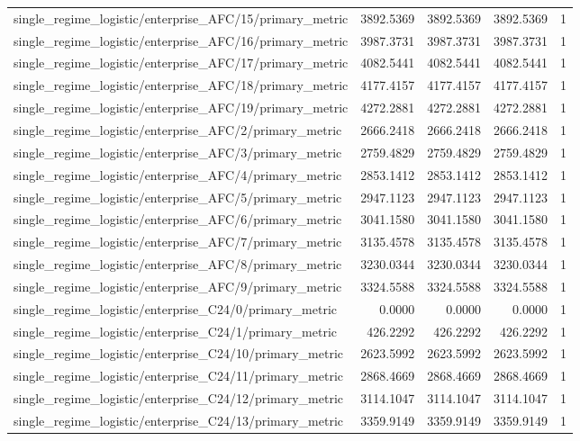 \begin{table}[h]
\begin{tabular}{lrrrr}
single_regime_logistic/enterprise_AFC/15/primary_metric & 3892.5369 & 3892.5369 & 3892.5369 & 1 \\
single_regime_logistic/enterprise_AFC/16/primary_metric & 3987.3731 & 3987.3731 & 3987.3731 & 1 \\
single_regime_logistic/enterprise_AFC/17/primary_metric & 4082.5441 & 4082.5441 & 4082.5441 & 1 \\
single_regime_logistic/enterprise_AFC/18/primary_metric & 4177.4157 & 4177.4157 & 4177.4157 & 1 \\
single_regime_logistic/enterprise_AFC/19/primary_metric & 4272.2881 & 4272.2881 & 4272.2881 & 1 \\
single_regime_logistic/enterprise_AFC/2/primary_metric & 2666.2418 & 2666.2418 & 2666.2418 & 1 \\
single_regime_logistic/enterprise_AFC/3/primary_metric & 2759.4829 & 2759.4829 & 2759.4829 & 1 \\
single_regime_logistic/enterprise_AFC/4/primary_metric & 2853.1412 & 2853.1412 & 2853.1412 & 1 \\
single_regime_logistic/enterprise_AFC/5/primary_metric & 2947.1123 & 2947.1123 & 2947.1123 & 1 \\
single_regime_logistic/enterprise_AFC/6/primary_metric & 3041.1580 & 3041.1580 & 3041.1580 & 1 \\
single_regime_logistic/enterprise_AFC/7/primary_metric & 3135.4578 & 3135.4578 & 3135.4578 & 1 \\
single_regime_logistic/enterprise_AFC/8/primary_metric & 3230.0344 & 3230.0344 & 3230.0344 & 1 \\
single_regime_logistic/enterprise_AFC/9/primary_metric & 3324.5588 & 3324.5588 & 3324.5588 & 1 \\
single_regime_logistic/enterprise_C24/0/primary_metric & 0.0000 & 0.0000 & 0.0000 & 1 \\
single_regime_logistic/enterprise_C24/1/primary_metric & 426.2292 & 426.2292 & 426.2292 & 1 \\
single_regime_logistic/enterprise_C24/10/primary_metric & 2623.5992 & 2623.5992 & 2623.5992 & 1 \\
single_regime_logistic/enterprise_C24/11/primary_metric & 2868.4669 & 2868.4669 & 2868.4669 & 1 \\
single_regime_logistic/enterprise_C24/12/primary_metric & 3114.1047 & 3114.1047 & 3114.1047 & 1 \\
single_regime_logistic/enterprise_C24/13/primary_metric & 3359.9149 & 3359.9149 & 3359.9149 & 1 \\

\end{tabular}
\end{table}
